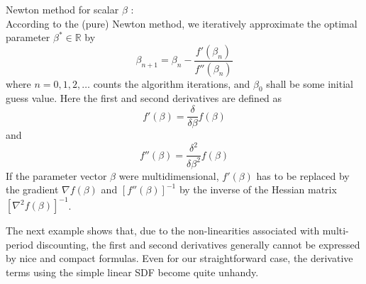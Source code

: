 \begin{definition}
	\label{def:newton_method}
	Newton method for scalar $\beta$ \cite[Section 5.1]{Beck14}: \\
	According to the (pure) Newton method, we iteratively approximate the optimal parameter $\beta^* \in \mathbb{R}$ by
	\[
	\beta_{n+1} = \beta_n - \frac{f'(\beta_n)}{f''(\beta_n)}
	\]
	where $n=0,1,2,\dots$ counts the algorithm iterations, and $\beta_0$ shall be some initial guess value.
	Here the first and second derivatives are defined as
	\[
	f'(\beta) = 
	\frac{\delta}{\delta \beta} f(\beta) 
	\]
	and
	\[
	f''(\beta) = 
	\frac{\delta^2}{\delta \beta^2} f(\beta) 
	\]
	If the parameter vector $\beta$ were multidimensional, $f'(\beta)$ has to be replaced by the gradient $\nabla f(\beta)$ and $\left[ f''(\beta) \right]^{-1}$ by the inverse of the Hessian matrix $\left[ \nabla^2 f(\beta) \right]^{-1}$.
\end{definition}


The next example shows that, due to the non-linearities associated with multi-period discounting, the first and second derivatives generally cannot be expressed by nice and compact formulas.
Even for our straightforward case, the derivative terms using the simple linear SDF become quite unhandy.


